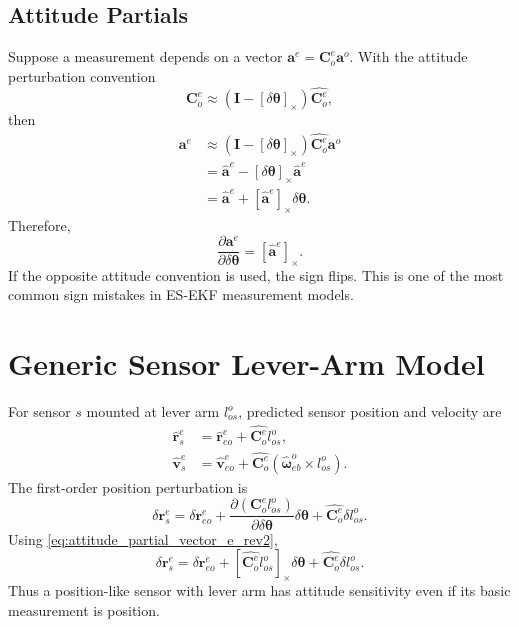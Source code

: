\documentclass[11pt,oneside]{book}
\renewcommand{\skew}[1]{\left[#1\right]_{\times}}
\newcommand{\vb}{\mathbf{v}}
\newcommand{\rb}{\mathbf{r}}
\newcommand{\I}{\mathbf{I}}
\newcommand{\Coe}{\mathbf{C}^{e}_{o}}
\begin{document}
\subsection{Attitude Partials}
Suppose a measurement depends on a vector $\mathbf{a}^e=\Coe\mathbf{a}^o$. With the attitude perturbation convention
\begin{equation}
\Coe\approx(\I-\skew{\delta\boldsymbol\theta})\hat{\Coe},
\end{equation}
then
\begin{align}
\mathbf{a}^e
&\approx(\I-\skew{\delta\boldsymbol\theta})\hat{\Coe}\mathbf{a}^o\\
&=\hat{\mathbf{a}}^e-\skew{\delta\boldsymbol\theta}\hat{\mathbf{a}}^e\\
&=\hat{\mathbf{a}}^e+\skew{\hat{\mathbf{a}}^e}\delta\boldsymbol\theta.
\end{align}
Therefore,
\begin{equation}
\frac{\partial \mathbf{a}^e}{\partial\delta\boldsymbol\theta}=\skew{\hat{\mathbf{a}}^e}.
\label{eq:attitude_partial_vector_e_rev2}
\end{equation}
If the opposite attitude convention is used, the sign flips. This is one of the most common sign mistakes in ES-EKF measurement models.

\section{Generic Sensor Lever-Arm Model}
For sensor $s$ mounted at lever arm $l_{os}^o$, predicted sensor position and velocity are
\begin{align}
\hat{\rb}_s^e &= \hat{\rb}_{eo}^e+\hat{\Coe}l_{os}^o,\\
\hat{\vb}_s^e &= \hat{\vb}_{eo}^e+\hat{\Coe}\left(\hat{\boldsymbol\omega}_{eb}^o\times l_{os}^o\right).
\end{align}
The first-order position perturbation is
\begin{equation}
\delta\rb_s^e
=\delta\rb_{eo}^e+\frac{\partial(\Coe l_{os}^o)}{\partial\delta\boldsymbol\theta}\delta\boldsymbol\theta+\hat{\Coe}\delta l_{os}^o.
\end{equation}
Using \cref{eq:attitude_partial_vector_e_rev2},
\begin{equation}
\delta\rb_s^e
=\delta\rb_{eo}^e+\skew{\hat{\Coe}l_{os}^o}\delta\boldsymbol\theta+\hat{\Coe}\delta l_{os}^o.
\label{eq:sensor_pos_error_lever_rev2}
\end{equation}
Thus a position-like sensor with lever arm has attitude sensitivity even if its basic measurement is position.
\end{document}
